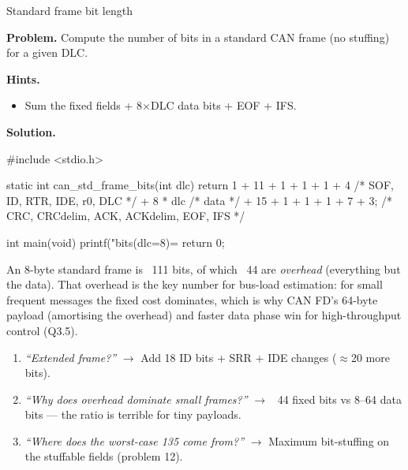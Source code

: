 \begin{gymproblem}{Standard frame bit length}

\textbf{Problem.} Compute the number of bits in a standard CAN frame (no
stuffing) for a given DLC.

\textbf{Hints.}
\begin{itemize}
\item Sum the fixed fields + 8$\times$DLC data bits + EOF + IFS.
\end{itemize}

\attempt

\textbf{Solution.}
\begin{cgym}
#include <stdio.h>

static int can_std_frame_bits(int dlc) {
    return 1 + 11 + 1 + 1 + 1 + 4   /* SOF, ID, RTR, IDE, r0, DLC */
         + 8 * dlc                   /* data */
         + 15 + 1 + 1 + 1 + 7 + 3;   /* CRC, CRCdelim, ACK, ACKdelim, EOF, IFS */
}

int main(void) {
    printf("bits(dlc=8)=%
    return 0;
}
\end{cgym}

An 8-byte standard frame is ~111 bits, of which ~44 are \emph{overhead}
(everything but the data). That overhead is the key number for bus-load
estimation: for small frequent messages the fixed cost dominates, which is why
CAN FD's 64-byte payload (amortising the overhead) and faster data phase win for
high-throughput control (Q3.5).

\followups
\begin{enumerate}
\item \emph{``Extended frame?''} $\rightarrow$ Add 18 ID bits + SRR + IDE
  changes ($\approx$20 more bits).
\item \emph{``Why does overhead dominate small frames?''} $\rightarrow$ ~44
  fixed bits vs 8--64 data bits --- the ratio is terrible for tiny payloads.
\item \emph{``Where does the worst-case 135 come from?''} $\rightarrow$ Maximum
  bit-stuffing on the stuffable fields (problem 12).
\end{enumerate}
\end{gymproblem}

